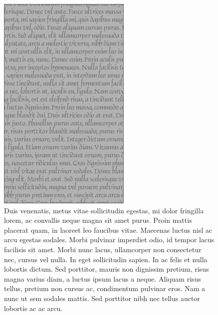 \begin{figure}[!t]
\begin{minipage}{.49\linewidth}
    \includegraphics[width=\linewidth]{figs/vertical-rectangle-gray}
  \end{minipage}
  \caption[Duis venenatis]{
    Duis venenatis, metus vitae sollicitudin egestas, mi dolor fringilla lorem, ac convallis neque magna sit amet purus.
Proin mattis placerat quam, in laoreet leo faucibus vitae.
Maecenas luctus nisl ac arcu egestas sodales.
Morbi pulvinar imperdiet odio, id tempor lacus facilisis sit amet.
Morbi nunc lacus, ullamcorper non consectetur nec, cursus vel nulla.
In eget sollicitudin sapien.
In ac felis et nulla lobortis dictum.
Sed porttitor, mauris non dignissim pretium, risus magna varius diam, a luctus ipsum lacus a neque.
Aliquam risus tellus, pretium non cursus ac, condimentum pulvinar eros.
Nam a nunc ut sem sodales mattis.
Sed porttitor nibh nec tellus auctor lobortis ac ac arcu.
  }
\end{figure}

